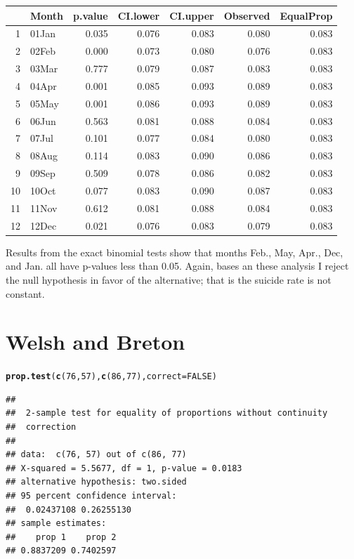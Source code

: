 \documentclass{article}\usepackage[]{graphicx}\usepackage[]{color}
\makeatletter
\newcommand{\hlnum}[1]{\textcolor[rgb]{0.686,0.059,0.569}{#1}}%
\newcommand{\hlstd}[1]{\textcolor[rgb]{0.345,0.345,0.345}{#1}}%
\newcommand{\hlkwc}[1]{\textcolor[rgb]{0.333,0.667,0.333}{#1}}%
\newcommand{\hlkwd}[1]{\textcolor[rgb]{0.737,0.353,0.396}{\textbf{#1}}}%
\newenvironment{kframe}{%
 \def\at@end@of@kframe{}%
 \ifinner\ifhmode%
  \def\at@end@of@kframe{\end{minipage}}%
  \begin{minipage}{\columnwidth}%
 \fi\fi%
 \def\FrameCommand##1{\hskip\@totalleftmargin \hskip-\fboxsep
 \colorbox{shadecolor}{##1}\hskip-\fboxsep
     \hskip-\linewidth \hskip-\@totalleftmargin \hskip\columnwidth}%
 \MakeFramed {\advance\hsize-\width
   \@totalleftmargin\z@ \linewidth\hsize
   \@setminipage}}%
 {\par\unskip\endMakeFramed%
 \at@end@of@kframe}
\newenvironment{knitrout}{}{} %
\makeatother
\begin{document}
\begin{table}[ht]
\centering
\begin{tabular}{rlrrrrr}
  \hline
 & Month & p.value & CI.lower & CI.upper & Observed & EqualProp \\ 
  \hline
1 & 01Jan & 0.035 & 0.076 & 0.083 & 0.080 & 0.083 \\ 
  2 & 02Feb & 0.000 & 0.073 & 0.080 & 0.076 & 0.083 \\ 
  3 & 03Mar & 0.777 & 0.079 & 0.087 & 0.083 & 0.083 \\ 
  4 & 04Apr & 0.001 & 0.085 & 0.093 & 0.089 & 0.083 \\ 
  5 & 05May & 0.001 & 0.086 & 0.093 & 0.089 & 0.083 \\ 
  6 & 06Jun & 0.563 & 0.081 & 0.088 & 0.084 & 0.083 \\ 
  7 & 07Jul & 0.101 & 0.077 & 0.084 & 0.080 & 0.083 \\ 
  8 & 08Aug & 0.114 & 0.083 & 0.090 & 0.086 & 0.083 \\ 
  9 & 09Sep & 0.509 & 0.078 & 0.086 & 0.082 & 0.083 \\ 
  10 & 10Oct & 0.077 & 0.083 & 0.090 & 0.087 & 0.083 \\ 
  11 & 11Nov & 0.612 & 0.081 & 0.088 & 0.084 & 0.083 \\ 
  12 & 12Dec & 0.021 & 0.076 & 0.083 & 0.079 & 0.083 \\ 
   \hline
\end{tabular}
\end{table}


Results from the exact binomial tests show that months Feb., May, Apr., Dec, and Jan. all have p-values less than 0.05.  Again, bases an these analysis I reject the null hypothesis in favor of the alternative; that is the suicide rate is not constant.

\section{Welsh and Breton}

\begin{knitrout}
\color{fgcolor}\begin{kframe}
\begin{alltt}
\hlkwd{prop.test}\hlstd{(}\hlkwd{c}\hlstd{(}\hlnum{76}\hlstd{,} \hlnum{57}\hlstd{),} \hlkwd{c}\hlstd{(}\hlnum{86}\hlstd{,} \hlnum{77}\hlstd{),} \hlkwc{correct} \hlstd{=} \hlnum{FALSE}\hlstd{)}
\end{alltt}
\begin{verbatim}
## 
## 	2-sample test for equality of proportions without continuity
## 	correction
## 
## data:  c(76, 57) out of c(86, 77)
## X-squared = 5.5677, df = 1, p-value = 0.0183
## alternative hypothesis: two.sided
## 95 percent confidence interval:
##  0.02437108 0.26255130
## sample estimates:
##    prop 1    prop 2 
## 0.8837209 0.7402597
\end{verbatim}
\end{kframe}
\end{knitrout}
\end{document}
